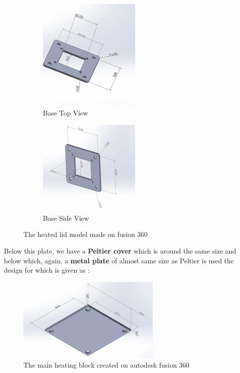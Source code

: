 \documentclass{article}
\begin{document}
\begin{figure}[htp]
    \centering
    \begin{subfigure}[b]{0.4\textwidth}
    \centering
    \includegraphics[width=5cm]{Images/Isolation_Base.png}
    \caption{Base Top View}
    \end{subfigure}
    \hfill
    \begin{subfigure}[b]{0.5\textwidth}
    \centering
    \includegraphics[width=5cm]{Images/Peltierbase2.jpeg}
    \caption{Base Side View}
    \end{subfigure}
    \caption{The heated lid model made on fusion 360}
    \label{fig:galaxy}
\end{figure}




Below this plate, we have a \textbf{Peltier cover} which is around the same size and below which, again, a \textbf{metal plate} of almost same size as Peltier is used the design for which is given as :

\begin{figure}[h]
    \centering
    \includegraphics[width=7cm]{Images/peltierbase.jpeg}
    \caption{The main heating block created on autodesk fusion 360}
    \label{fig:galaxy}
\end{figure}
\end{document}
